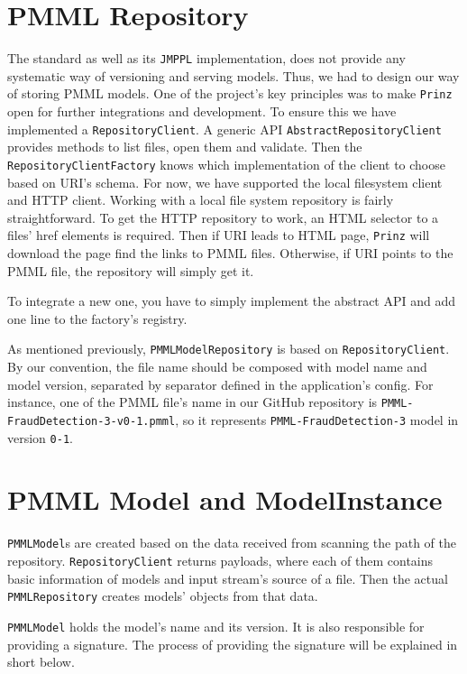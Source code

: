 \section{PMML Repository}
\label{sec:pmml-repository}

The standard as well as its \texttt{JMPPL} implementation, does not provide any systematic way of versioning and serving models.
Thus, we had to design our way of storing PMML models. One of the project’s key principles was
to make \texttt{Prinz} open for further integrations and development. To ensure this we have implemented a \texttt{RepositoryClient}.
A generic API \texttt{AbstractRepositoryClient} provides methods to list files, open them and validate. Then the \texttt{RepositoryClientFactory}
knows which implementation of the client to choose based on URI’s schema. For now, we have supported the local filesystem client and HTTP client.
Working with a local file system repository is fairly straightforward. To get the HTTP repository to work, an HTML selector to a files' href elements
is required. Then if URI leads to HTML page, \texttt{Prinz} will download the page find the links to PMML files. Otherwise, if URI points
to the PMML file, the repository will simply get it.

To integrate a new one, you have to simply implement the abstract API and add one line to the factory’s registry.

As mentioned previously, \texttt{PMMLModelRepository} is based on \texttt{RepositoryClient}. By our convention,
the file name should be composed with model name and model version, separated by separator defined in the application’s config.
For instance, one of the PMML file's name in our GitHub repository is \texttt{PMML-FraudDetection-3-v0-1.pmml}, so it represents
\texttt{PMML-FraudDetection-3} model in version \texttt{0-1}.

\section{PMML Model and ModelInstance}

\texttt{PMMLModel}s are created based on the data received from scanning the path of the repository.
\texttt{RepositoryClient} returns payloads, where each of them contains basic information of models and input stream's source of a file.
Then the actual \texttt{PMMLRepository} creates models’ objects from that data.

\texttt{PMMLModel} holds the model’s name and its version. It is also responsible for providing a signature. The process of providing the signature will
be explained in short below.

